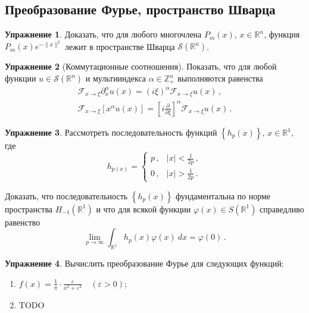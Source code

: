 \documentclass[a4paper, 12pt]{article}
\theoremstyle{definition}
\newtheorem{exercise}{Упражнение}
\begin{document}
\subsection{Преобразование Фурье, пространство Шварца} %

\begin{exercise} %
    Доказать, что для любого многочлена \({ P_{m}(x) }\), \({ x \in \mathbb R^{n} }\), функция \({ P_{m}(x) e^{-\lVert x \rVert^2} }\) лежит в пространстве Шварца \({ \mathcal S(\mathbb R^{n}) }\).
\end{exercise}

\begin{exercise}[Коммутационные соотношения]
    Показать, что для любой функции \({ u \in \mathcal S(\mathbb R^{n}) }\) и мультииндекса \({ \alpha \in \mathbb Z_{+}^{n} }\) выполняются равенства
    \[
        \begin{gathered}
            \mathcal F_{x \to \xi} \partial_{x}^{\alpha} u(x) = (i\xi)^{\alpha} \mathcal F_{x \to \xi} u(x)\,, \\
            \mathcal F_{x \to \xi} \left[ x^{\alpha} u(x) \right] = \left[ i \frac{\partial}{\partial \xi} \right]^{\alpha} \mathcal F_{x \to \xi}u(x)\,.
        \end{gathered}
    \]
\end{exercise}

\begin{exercise} %
    Рассмотреть последовательность функций \({ \left\{ h_{p}(x) \right\} }\), \({ x \in \mathbb R^{1} }\), где \[
        h_{p(x)} = \begin{cases}
            p\,, & \lvert x \rvert < \frac{1}{2p}\,, \\
            0\,, & \lvert x \rvert > \frac{1}{2p}\,.
        \end{cases}
    \]

    Доказать, что последовательность \({ \left\{ h_{p}(x) \right\} }\) фундаментальна по норме пространства \({ H_{-1}(\mathbb R^{1}) }\) и что для всякой функции \({ \varphi(x) \in S(\mathbb R^{1}) }\) справедливо равенство \[
        \lim_{p \to \infty} \int_{\mathbb R^{1}} h_{p}(x) \varphi(x)\: dx = \varphi(0)\,.
    \]
\end{exercise}

\begin{exercise} %
    Вычислить преобразование Фурье для следующих функций:
    \begin{enumerate}
        \item \({ \displaystyle f(x) = \frac{1}{\pi} \cdot \frac{\varepsilon}{x^2 + \varepsilon^2} \quad (\varepsilon > 0) }\);
        \item TODO
    \end{enumerate}
\end{exercise}
\end{document}
